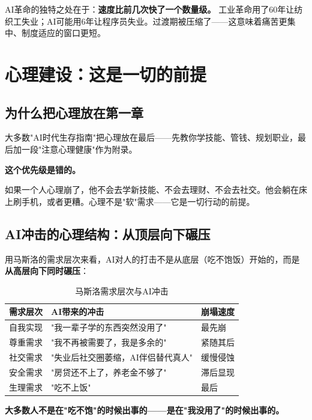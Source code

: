 \documentclass[a4paper,12pt,UTF8]{ctexart}
\begin{document}
AI革命的独特之处在于：\textbf{速度比前几次快了一个数量级。} 工业革命用了60年让纺织工失业；AI可能用6年让程序员失业。过渡期被压缩了——这意味着痛苦更集中、制度适应的窗口更短。

\section{心理建设：这是一切的前提}

\subsection*{为什么把心理放在第一章}

大多数"AI时代生存指南"把心理放在最后——先教你学技能、管钱、规划职业，最后加一段"注意心理健康"作为附录。

\textbf{这个优先级是错的。}

如果一个人心理崩了，他不会去学新技能、不会去理财、不会去社交。他会躺在床上刷手机，或者更糟。心理不是"软"需求——它是一切行动的前提。

\subsection{AI冲击的心理结构：从顶层向下碾压}

用马斯洛的需求层次来看，AI对人的打击不是从底层（吃不饱饭）开始的，而是\textbf{从高层向下同时碾压}：

\begin{table}[H]
\centering
\begin{tabularx}{\textwidth}{l X l}
\toprule
\textbf{需求层次} & \textbf{AI带来的冲击} & \textbf{崩塌速度} \\
\midrule
自我实现 & "我一辈子学的东西突然没用了" & 最先崩 \\
尊重需求 & "我不再被需要了，我是多余的" & 紧随其后 \\
社交需求 & "失业后社交圈萎缩，AI伴侣替代真人" & 缓慢侵蚀 \\
安全需求 & "房贷还不上了，养老金不够了" & 滞后显现 \\
生理需求 & "吃不上饭" & 最后 \\
\bottomrule
\end{tabularx}
\caption{马斯洛需求层次与AI冲击}
\end{table}

\textbf{大多数人不是在"吃不饱"的时候出事的——是在"我没用了"的时候出事的。}
\end{document}
